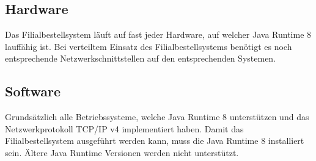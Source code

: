\subsection{Hardware}
Das Filialbestellsystem läuft auf fast jeder Hardware, auf welcher Java Runtime 8 lauffähig ist. Bei verteiltem Einsatz des Filialbestellsystems benötigt es noch entsprechende Netzwerkschnittstellen auf den entsprechenden Systemen.

\subsection{Software}
Grundsätzlich alle Betriebssysteme, welche Java Runtime 8 unterstützen und das Netzwerkprotokoll TCP/IP v4 implementiert haben.
Damit das Filialbestellsystem ausgeführt werden kann, muss die Java Runtime 8 installiert sein. Ältere Java Runtime Versionen werden nicht unterstützt.
